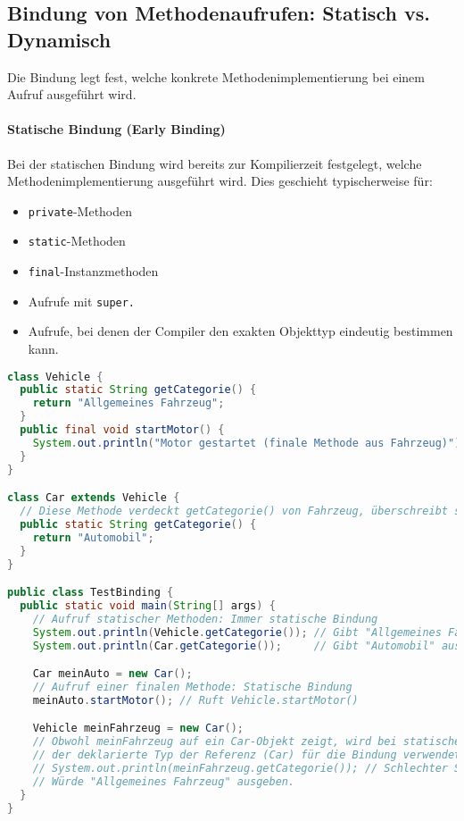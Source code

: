 \subsection{Bindung von Methodenaufrufen: Statisch vs. Dynamisch}
\label{ssec:bindungen}

Die Bindung legt fest, welche konkrete Methodenimplementierung bei einem Aufruf
ausgeführt wird.

\paragraph{Statische Bindung (Early Binding)}
Bei der statischen Bindung wird bereits zur Kompilierzeit festgelegt, welche
Methodenimplementierung ausgeführt wird. Dies geschieht typischerweise für:
\begin{itemize}
  \item \texttt{private}-Methoden
  \item \texttt{static}-Methoden
  \item \texttt{final}-Instanzmethoden
  \item Aufrufe mit \texttt{super.}
  \item Aufrufe, bei denen der Compiler den exakten Objekttyp eindeutig bestimmen kann.
\end{itemize}

\begin{lstlisting}[language=Java, caption={Beispiele für statische Bindung}]
class Vehicle {
  public static String getCategorie() {
    return "Allgemeines Fahrzeug";
  }
  public final void startMotor() {
    System.out.println("Motor gestartet (finale Methode aus Fahrzeug)");
  }
}

class Car extends Vehicle {
  // Diese Methode verdeckt getCategorie() von Fahrzeug, überschreibt sie aber nicht.
  public static String getCategorie() {
    return "Automobil";
  }
}

public class TestBinding {
  public static void main(String[] args) {
    // Aufruf statischer Methoden: Immer statische Bindung
    System.out.println(Vehicle.getCategorie()); // Gibt "Allgemeines Fahrzeug" aus
    System.out.println(Car.getCategorie());     // Gibt "Automobil" aus

    Car meinAuto = new Car();
    // Aufruf einer finalen Methode: Statische Bindung
    meinAuto.startMotor(); // Ruft Vehicle.startMotor()

    Vehicle meinFahrzeug = new Car();
    // Obwohl meinFahrzeug auf ein Car-Objekt zeigt, wird bei statischen Methoden
    // der deklarierte Typ der Referenz (Car) für die Bindung verwendet.
    // System.out.println(meinFahrzeug.getCategorie()); // Schlechter Stil! Sollte Vehicle.getCategorie() sein.
    // Würde "Allgemeines Fahrzeug" ausgeben.
  }
}
\end{lstlisting}

